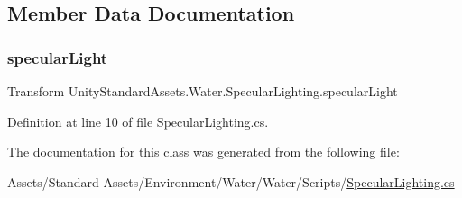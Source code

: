 \subsection{Member Data Documentation}
\mbox{\label{class_unity_standard_assets_1_1_water_1_1_specular_lighting_a715795cec47659a254638d071c0c9c51}} 
\subsubsection{\texorpdfstring{specular\+Light}{specularLight}}
{\footnotesize\ttfamily Transform Unity\+Standard\+Assets.\+Water.\+Specular\+Lighting.\+specular\+Light}



Definition at line 10 of file Specular\+Lighting.\+cs.



The documentation for this class was generated from the following file\+:\begin{DoxyCompactItemize}
\item 
Assets/\+Standard Assets/\+Environment/\+Water/\+Water/\+Scripts/\mbox{\hyperlink{_specular_lighting_8cs}{Specular\+Lighting.\+cs}}\end{DoxyCompactItemize}
